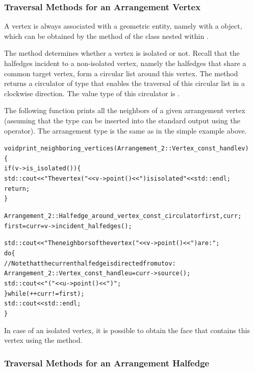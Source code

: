 \subsubsection{Traversal Methods for an Arrangement Vertex\label{arr_sssec:tr_vertex}}

A vertex is always associated with a geometric entity, namely with
a  object, which can be obtained by the 
method of the  class nested within .

The  method determines whether a vertex is isolated
or not. Recall that the halfedges incident to a non-isolated vertex,
namely the halfedges that share a common target vertex, form a circular
list around this vertex. The  method returns
a circulator of type 
that enables the traversal of this circular list in a clockwise
direction. The value type of this circulator is .

The following function prints all the neighbors of a given
arrangement vertex (assuming that the  type can be
inserted into the standard output using the \ccc{<<} operator). The
arrangement type is the same as in the simple example above.
\begin{alltt}
void print_neighboring_vertices (Arrangement_2::Vertex_const_handle v)
\{
  if (v->is_isolated()) \{
    std::cout << "The vertex (" << v->point() << ") is isolated" << std::endl;
    return;
  \}

  Arrangement_2::Halfedge_around_vertex_const_circulator first, curr;
  first = curr = v->incident_halfedges();

  std::cout << "The neighbors of the vertex (" << v->point() << ") are:";
  do \{
    // Note that the current halfedge is directed from u to v:
    Arrangement_2::Vertex_const_handle u = curr->source();
    std::cout << " (" << u->point() << ")";
  \} while (++curr != first);
  std::cout << std::endl;
\}
\end{alltt}

In case of an isolated vertex, it is possible to obtain the face
that contains this vertex using the  method.

\subsubsection{Traversal Methods for an Arrangement Halfedge\label{arr_sssec:tr_halfedge}}

